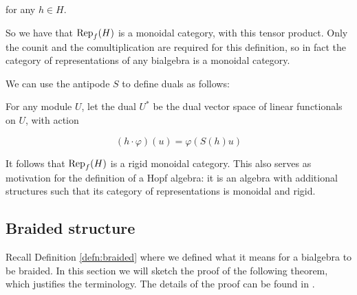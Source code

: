  for any $h\in H$.

So we have that $\operatorname{Rep}_f(H)$ is a monoidal category, with this tensor product.
Only the counit and the comultiplication are required for this definition, so
in fact the category of representations of any bialgebra is a monoidal
category.

We can use the antipode $S$ to define duals as follows:

For any module $U$, let the dual $U^*$ be the dual vector space of linear
functionals on $U$, with action

\begin{equation}
    (h\cdot \varphi)(u)  = \varphi(S(h) u)
\end{equation}

It follows that $\operatorname{Rep}_f(H)$ is a rigid monoidal category. This also serves as
motivation for the definition of a Hopf algebra: it is an algebra with
additional structures such that its category of representations is monoidal and
rigid. 


\subsection{Braided structure}
\label{bialgtocategory}
Recall Definition \ref{defn:braided} where we defined what it means for a
bialgebra to be braided.  In this section we will sketch the proof of the
following theorem, which justifies the terminology. The details of the proof
can be found in \cite{Kassel1994}.

